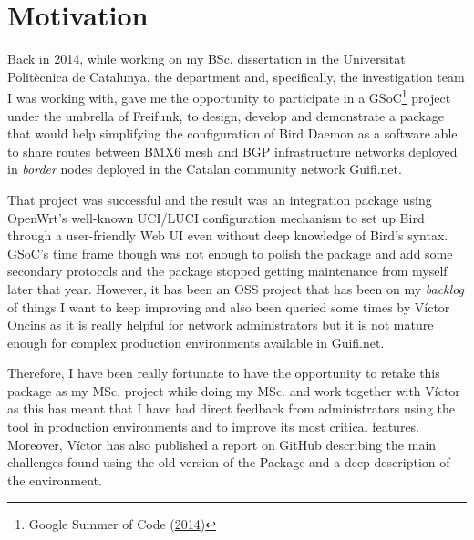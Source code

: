 
\section{Motivation}
\label{sec:motivation}
Back in 2014, while working on my BSc. dissertation in the Universitat Politècnica de Catalunya, the department and, specifically, the investigation team I was working with, gave me the opportunity to participate in a GSoC\footnote{Google Summer of Code (\href{https://www.google-melange.com/archive/gsoc/2014/orgs/freifunk/projects/eloicaso.html}{2014})} project under the umbrella of Freifunk, to design, develop and demonstrate a package that would help simplifying the configuration of Bird Daemon as a software able to share routes between BMX6 mesh and BGP infrastructure networks deployed in \textit{border} nodes deployed in the Catalan community network Guifi.net.

That project was successful and the result was an integration package using OpenWrt's well-known UCI/LUCI configuration mechanism to set up Bird through a user-friendly Web UI even without deep knowledge of Bird's syntax. GSoC's time frame though was not enough to polish the package and add some secondary protocols and the package stopped getting maintenance from myself later that year. However, it has been an OSS project that has been on my \textit{backlog} of things I want to keep improving and also been queried some times by Víctor Oncins as it is really helpful for network administrators but it is not mature enough for complex production environments available in Guifi.net.

Therefore, I have been really fortunate to have the opportunity to retake this package as my MSc. project while doing my MSc. and work together with Víctor as this has meant that I have had direct feedback from administrators using the tool in production environments and to improve its most critical features. Moreover, Víctor has also published a report on GitHub \cite{bgpbmx6} describing the main challenges found using the old version of the Package and a deep description of the environment.

